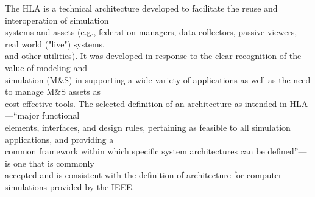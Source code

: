 \vspace{3.2pt}
The HLA is a technical architecture developed to facilitate the reuse and interoperation of simulation\\
systems and assets (e.g., federation managers, data collectors, passive viewers, real world ("live") systems,\\
and other utilities). It was developed in response to the clear recognition of the value of modeling and\\
simulation (M\&S) in supporting a wide variety of applications as well as the need to manage M\&S assets as\\
cost effective tools. The selected definition of an architecture as intended in HLA---``major functional\\
elements, interfaces, and design rules, pertaining as feasible to all simulation applications, and providing a\\
common framework within which specific system architectures can be defined''---is one that is commonly\\
accepted and is consistent with the definition of architecture for computer simulations provided by the IEEE.

